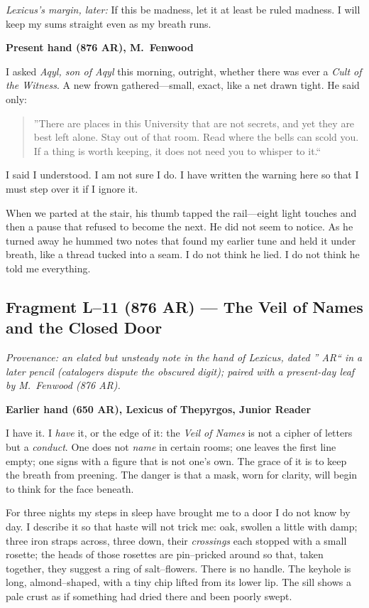 \documentclass[11pt]{article}
\numberwithin{equation}{section} %
\theoremstyle{plain} %
\theoremstyle{definition} %
\theoremstyle{remark} %
\begin{document}
\medskip
\noindent\textit{Lexicus's margin, later:} If this be madness, let it at least be ruled madness. I will keep my sums straight even as my breath runs.

\medskip
\noindent\textbf{Present hand (876 AR), M.\ Fenwood}

I asked \textit{Aqyl, son of Aqyl} this morning, outright, whether there was ever a \emph{Cult of the Witness}. A new frown gathered---small, exact, like a net drawn tight. He said only:

\begin{quote}\small
''There are places in this University that are not secrets, and yet they are best left alone. Stay out of that room. Read where the bells can scold you. If a thing is worth keeping, it does not need you to whisper to it.``
\end{quote}

I said I understood. I am not sure I do. I have written the warning here so that I must step over it if I ignore it.

When we parted at the stair, his thumb tapped the rail---eight light touches and then a pause that refused to become the next. He did not seem to notice. As he turned away he hummed two notes that found my earlier tune and held it under breath, like a thread tucked into a seam. I do not think he lied. I do not think he told me everything.

\subsection{Fragment L--11 (876 AR)  --- The Veil of Names and the Closed Door}
\label{frag:l11}

\noindent\textit{Provenance: an elated but unsteady note in the hand of Lexicus, dated '' AR`` in a later pencil (catalogers dispute the obscured digit); paired with a present-day leaf by M.\ Fenwood (876 AR).}

\medskip
\noindent\textbf{Earlier hand (650 AR), Lexicus of Thepyrgos, Junior Reader}

I have it. I \emph{have} it, or the edge of it: the \textit{Veil of Names} is not a cipher of letters but a \emph{conduct}. One does not \emph{name} in certain rooms; one leaves the first line empty; one signs with a figure that is not one's own. The grace of it is to keep the breath from preening. The danger is that a mask, worn for clarity, will begin to think for the face beneath.

For three nights my steps in sleep have brought me to a door I do not know by day. I describe it so that haste will not trick me: oak, swollen a little with damp; three iron straps across, three down, their \emph{crossings} each stopped with a small rosette; the heads of those rosettes are pin--pricked around so that, taken together, they suggest a ring of salt--flowers. There is no handle. The keyhole is long, almond--shaped, with a tiny chip lifted from its lower lip. The sill shows a pale crust as if something had dried there and been poorly swept.
\end{document}
